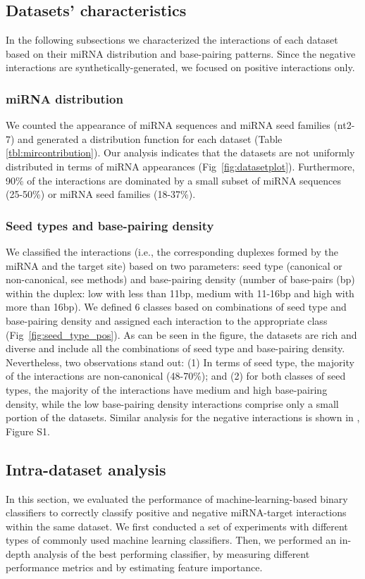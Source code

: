 \documentclass{bmcart}
\begin{document}
\subsection*{Datasets' characteristics}
In the following subsections we characterized the interactions of each dataset based on their miRNA distribution and base-pairing patterns. Since the negative interactions are synthetically-generated, we focused on positive interactions only.

\subsubsection*{miRNA distribution}
We counted the appearance of miRNA sequences and miRNA seed families (nt2-7) and generated a distribution function for each dataset (Table \ref{tbl:mircontribution}). Our analysis indicates that the datasets are not uniformly distributed in terms of miRNA appearances (Fig~\ref{fig:datasetplot}). Furthermore, 90\% of the interactions are dominated by a small subset of miRNA sequences (25-50\%) or miRNA seed families (18-37\%).




\subsubsection*{Seed types and base-pairing density}
We classified the interactions (i.e., the corresponding duplexes formed by the miRNA and the target site) based on two parameters: seed type (canonical or non-canonical, see methods) and base-pairing density (number of base-pairs (bp) within the duplex: low with less than 11bp, medium with 11-16bp and high with more than 16bp). We defined 6 classes based on combinations of seed type and base-pairing density and assigned each interaction to the appropriate class (Fig~\ref{fig:seed_type_pos}). As can be seen in the figure, the datasets are rich and diverse and include all the combinations of seed type and base-pairing density.
Nevertheless, two observations stand out: 
(1) In terms of seed type, the majority of the interactions are non-canonical (48-70\%); and (2) for both classes of seed types,  the majority of the interactions have medium and high base-pairing density, while the low base-pairing density interactions comprise only a small portion of the datasets. Similar analysis for the negative interactions is shown in , Figure S1.

\subsection*{Intra-dataset analysis} \label{nameref:indataset}
In this section, we evaluated the performance of machine-learning-based binary classifiers to correctly classify positive and negative miRNA-target interactions within the same dataset. 
We first conducted a set of experiments with different types of commonly used machine learning classifiers. Then, we performed an in-depth analysis of the best performing classifier, by measuring different performance metrics and by estimating feature importance.
\end{document}

